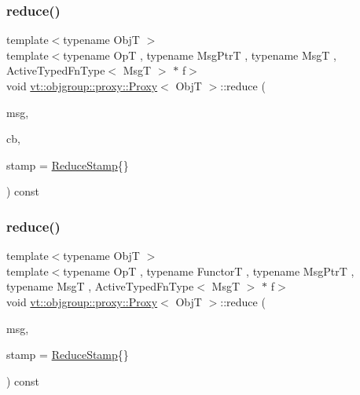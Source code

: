 \subsubsection{\texorpdfstring{reduce()}{reduce()}\hspace{0.1cm}{\footnotesize\ttfamily [1/3]}}
{\footnotesize\ttfamily template$<$typename ObjT $>$ \\
template$<$typename OpT , typename Msg\+PtrT , typename MsgT , Active\+Typed\+Fn\+Type$<$ Msg\+T $>$ $\ast$ f$>$ \\
void \hyperlink{structvt_1_1objgroup_1_1proxy_1_1_proxy}{vt\+::objgroup\+::proxy\+::\+Proxy}$<$ ObjT $>$\+::reduce (\begin{DoxyParamCaption}\item[{Msg\+PtrT}]{msg,  }\item[{\hyperlink{namespacevt_a36db99df4c973d48b1118a293fff533f}{Callback}$<$ MsgT $>$}]{cb,  }\item[{\hyperlink{structvt_1_1objgroup_1_1proxy_1_1_proxy_a337be4c20cf11ff6477c7a66208cc909}{Reduce\+Stamp}}]{stamp = {\ttfamily \hyperlink{structvt_1_1objgroup_1_1proxy_1_1_proxy_a337be4c20cf11ff6477c7a66208cc909}{Reduce\+Stamp}\{\}} }\end{DoxyParamCaption}) const}

\mbox{\label{structvt_1_1objgroup_1_1proxy_1_1_proxy_a023cfc5be29752b2d91f8f0519c379b9}} 
\subsubsection{\texorpdfstring{reduce()}{reduce()}\hspace{0.1cm}{\footnotesize\ttfamily [2/3]}}
{\footnotesize\ttfamily template$<$typename ObjT $>$ \\
template$<$typename OpT , typename FunctorT , typename Msg\+PtrT , typename MsgT , Active\+Typed\+Fn\+Type$<$ Msg\+T $>$ $\ast$ f$>$ \\
void \hyperlink{structvt_1_1objgroup_1_1proxy_1_1_proxy}{vt\+::objgroup\+::proxy\+::\+Proxy}$<$ ObjT $>$\+::reduce (\begin{DoxyParamCaption}\item[{Msg\+PtrT}]{msg,  }\item[{\hyperlink{structvt_1_1objgroup_1_1proxy_1_1_proxy_a337be4c20cf11ff6477c7a66208cc909}{Reduce\+Stamp}}]{stamp = {\ttfamily \hyperlink{structvt_1_1objgroup_1_1proxy_1_1_proxy_a337be4c20cf11ff6477c7a66208cc909}{Reduce\+Stamp}\{\}} }\end{DoxyParamCaption}) const}

